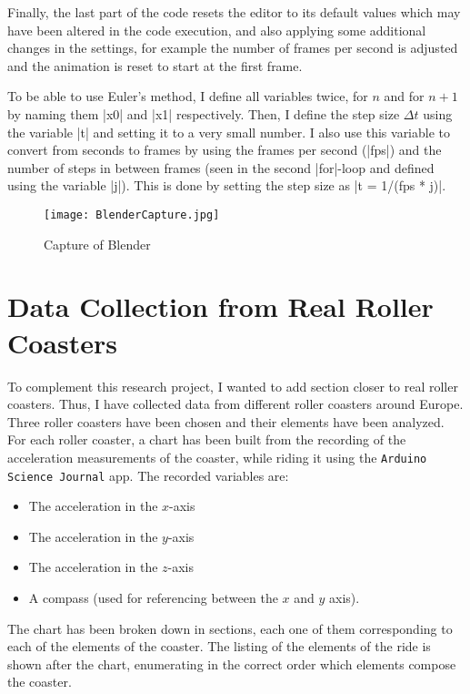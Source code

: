 \documentclass[12pt,twoside,a4paper]{article}
\begin{document}
	Finally, the last part of the code resets the editor to its default values which may have been altered in the code execution, and also applying some additional changes in the settings, for example the number of frames per second is adjusted and the animation is reset to start at the first frame.
	
	To be able to use Euler's method, I define all variables twice, for $n$ and for $n + 1$ by naming them \pyth|x0| and \pyth|x1| respectively. Then, I define the step size $\Delta t$ using the variable \pyth|t| and setting it to a very small number. I also use this variable to convert from seconds to frames by using the frames per second (\pyth|fps|) and the number of steps in between frames (seen in the second \pyth|for|-loop and defined using the variable \pyth|j|). This is done by setting the step size as \pyth|t = 1/(fps * j)|.
	
	\begin{figure}[H]
		\centering
		\texttt{[image: BlenderCapture.jpg]}
		\caption{Capture of Blender}
		\label{fig:Blender Editor Capture}
	\end{figure}
	
	\cleardoublepage
	
	\section{Data Collection from Real Roller Coasters}
	To complement this research project, I wanted to add section closer to real roller coasters. Thus, I have collected data from different roller coasters around Europe. Three roller coasters have been chosen and their elements have been analyzed. For each roller coaster, a chart has been built from the recording of the acceleration measurements of the coaster, while riding it using the \verb|Arduino Science Journal| app. The recorded variables are:
		\begin{itemize}
			\item The acceleration in the $x$-axis
			\item The acceleration in the $y$-axis
			\item The acceleration in the $z$-axis
			\item A compass (used for referencing between the $x$ and $y$ axis).
		\end{itemize}
	
	The chart has been broken down in sections, each one of them corresponding to each of the elements of the coaster. The listing of the elements of the ride is shown after the chart, enumerating in the correct order which elements compose the coaster.
	
\end{document}
